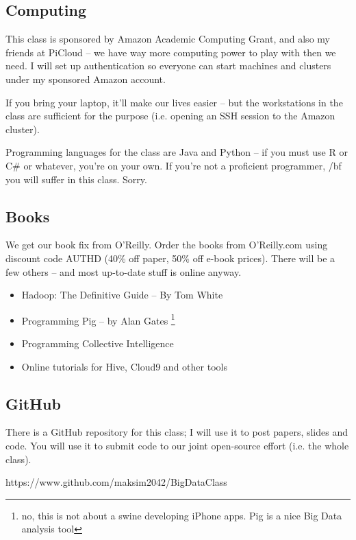 \documentclass[12pt]{article}
\begin{document}
\subsection{Computing}

This class is sponsored by Amazon Academic Computing Grant, and also my friends at PiCloud -- we have way more computing power to play with then we need. I will set up authentication so everyone can start machines and clusters under my sponsored Amazon account. 

If you bring your laptop, it'll make our lives easier -- but the workstations in the class are sufficient for the purpose (i.e. opening an SSH session to the Amazon cluster).

Programming languages for the class are Java and Python -- if you must use R or C\# or whatever, you're on your own. If you're not a proficient programmer, {/bf you will suffer in this class.} Sorry.

\subsection{Books}

We get our book fix from O'Reilly. Order the books from O'Reilly.com using discount code AUTHD (40\% off paper, 50\% off e-book prices). There will be a few others -- and most up-to-date stuff is online anyway.

\begin{itemize}
\item Hadoop: The Definitive Guide -- By Tom White
\item Programming Pig -- by Alan Gates \footnote{no, this is not about a swine developing iPhone apps. Pig is a nice Big Data analysis tool}
\item Programming Collective Intelligence 
\item Online tutorials for Hive, Cloud9 and other tools

\end{itemize}

\subsection{GitHub}

There is a GitHub repository for this class; I will use it to post papers, slides and code. You will use it to submit code to our joint open-source effort (i.e. the whole class). 

https://www.github.com/maksim2042/BigDataClass
\end{document}
